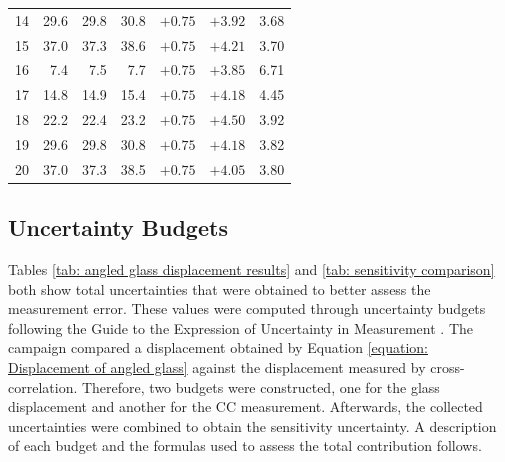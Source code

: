 \begin{table}[htbp]
\begin{tabular}{lrrrrrr}
        14 &  29.6 &  29.8 &  30.8 &  $+0.75$ &  $+3.92$ &  3.68 \\
        15 &  37.0 &  37.3 &  38.6 &  $+0.75$ &  $+4.21$ &  3.70 \\
        16 &   7.4 &   7.5 &   7.7 &  $+0.75$ &  $+3.85$ &  6.71 \\
        17 &  14.8 &  14.9 &  15.4 &  $+0.75$ &  $+4.18$ &  4.45 \\
        18 &  22.2 &  22.4 &  23.2 &  $+0.75$ &  $+4.50$ &  3.92 \\
        19 &  29.6 &  29.8 &  30.8 &  $+0.75$ &  $+4.18$ &  3.82 \\
        20 &  37.0 &  37.3 &  38.5 &  $+0.75$ &  $+4.05$ &  3.80 \\
        \bottomrule
    \end{tabular}
\end{table}

\subsection{Uncertainty Budgets}
\label{subsection: Angled Glass Uncertainty Budgets}

\par Tables \ref{tab: angled glass displacement results} and \ref{tab: sensitivity comparison} both show total uncertainties that were obtained to better assess the measurement error. These values were computed through uncertainty budgets following the Guide to the Expression of Uncertainty in Measurement \cite{JCGM2008}. The campaign compared a displacement obtained by Equation \ref{equation: Displacement of angled glass} against the displacement measured by cross-correlation. Therefore, two budgets were constructed, one for the glass displacement and another for the CC measurement. Afterwards, the collected uncertainties were combined to obtain the sensitivity uncertainty. A description of each budget and the formulas used to assess the total contribution follows.

